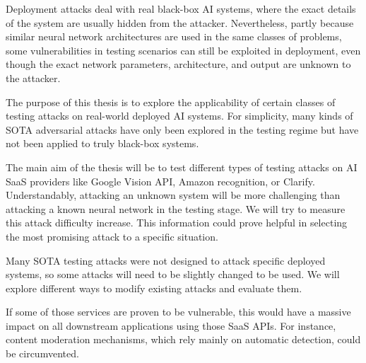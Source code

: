 Deployment attacks deal with real black-box AI systems, where the exact details of the system are usually hidden from the attacker. Nevertheless, partly because similar neural network architectures are used in the same classes of problems, some vulnerabilities in testing scenarios can still be exploited in deployment, even though the exact network parameters, architecture, and output are unknown to the attacker.

The purpose of this thesis is to explore the applicability of certain classes of testing attacks on real-world deployed AI systems. For simplicity, many kinds of SOTA adversarial attacks have only been explored in the testing regime but have not been applied to truly black-box systems. 

The main aim of the thesis will be to test different types of testing attacks on AI SaaS providers like Google Vision API, Amazon recognition, or Clarify. Understandably, attacking an unknown system will be more challenging than attacking a known neural network in the testing stage. We will try to measure this attack difficulty increase. This information could prove helpful in selecting the most promising attack to a specific situation. 

Many SOTA testing attacks were not designed to attack specific deployed systems, so some attacks will need to be slightly changed to be used. We will explore different ways to modify existing attacks and evaluate them.

If some of those services are proven to be vulnerable, this would have a massive impact on all downstream applications using those SaaS APIs. For instance, content moderation mechanisms, which rely mainly on automatic detection, could be circumvented.

